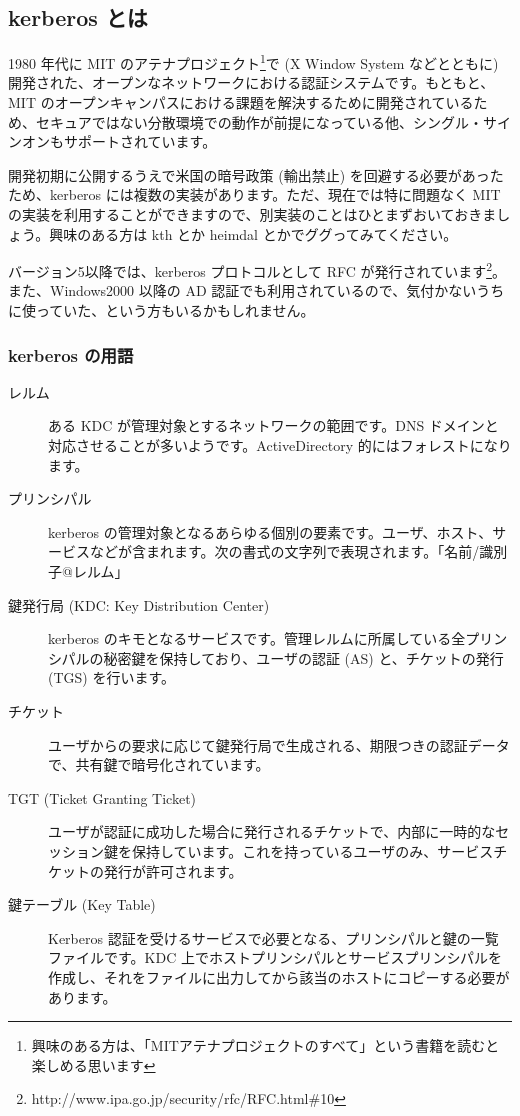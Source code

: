 \documentclass[mingoth,a4paper]{jsarticle}
\begin{document}
\subsection{kerberos とは}

1980 年代に MIT のアテナプロジェクト\footnote{興味のある方は、「MITアテナプロジェクトのすべて」という書籍を読むと楽しめる思います}で (X Window System などとともに) 開発された、オープンなネットワークにおける認証システムです。もともと、MIT のオープンキャンパスにおける課題を解決するために開発されているため、セキュアではない分散環境での動作が前提になっている他、シングル・サインオンもサポートされています。

開発初期に公開するうえで米国の暗号政策 (輸出禁止) を回避する必要があったため、kerberos には複数の実装があります。ただ、現在では特に問題なく MIT の実装を利用することができますので、別実装のことはひとまずおいておきましょう。興味のある方は kth とか heimdal とかでググってみてください。

バージョン5以降では、kerberos プロトコルとして RFC が発行されています\footnote{http://www.ipa.go.jp/security/rfc/RFC.html\#10}。また、Windows2000 以降の AD 認証でも利用されているので、気付かないうちに使っていた、という方もいるかもしれません。

\subsubsection{kerberos の用語}

\begin{description}
  \item [レルム] ある KDC が管理対象とするネットワークの範囲です。DNS ドメインと対応させることが多いようです。ActiveDirectory 的にはフォレストになります。
  \item [プリンシパル] kerberos の管理対象となるあらゆる個別の要素です。ユーザ、ホスト、サービスなどが含まれます。次の書式の文字列で表現されます。「名前/識別子@レルム」

  \item [鍵発行局 (KDC: Key Distribution Center)] kerberos のキモとなるサービスです。管理レルムに所属している全プリンシパルの秘密鍵を保持しており、ユーザの認証 (AS) と、チケットの発行 (TGS) を行います。

  \item [チケット] ユーザからの要求に応じて鍵発行局で生成される、期限つきの認証データで、共有鍵で暗号化されています。

  \item [TGT (Ticket Granting Ticket)] ユーザが認証に成功した場合に発行されるチケットで、内部に一時的なセッション鍵を保持しています。これを持っているユーザのみ、サービスチケットの発行が許可されます。
  \item [鍵テーブル (Key Table)] Kerberos 認証を受けるサービスで必要となる、プリンシパルと鍵の一覧ファイルです。KDC 上でホストプリンシパルとサービスプリンシパルを作成し、それをファイルに出力してから該当のホストにコピーする必要があります。

\end{description}
\end{document}
